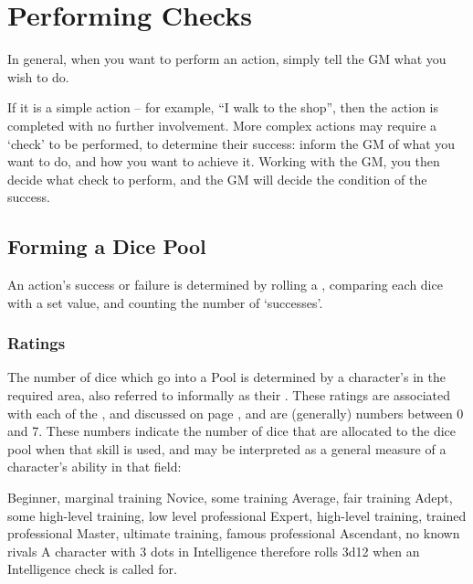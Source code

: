 \chapter{Performing Checks}\label{C:Checks}


In general, when you want to perform an action, simply tell the GM what you wish to do. 

If it is a simple action – for example, “I walk to the shop”, then the action is completed with no further involvement. More complex actions may require a ‘check’ to be performed, to determine their success: inform the GM of what you want to do, and how you want to achieve it. Working with the GM, you then decide what check to perform, and the GM will decide the condition of the success.


\section{Forming a Dice Pool}

An action's success or failure is determined by rolling a , comparing each dice with a set value, and counting the number of `successes'.

\subsection{Ratings}

The number of dice which go into a Pool is determined by a character's  in the required area, also referred to informally as their . These ratings are associated with each of the ,  and  discussed on page \pageref{C:Aspects}, and are (generally) numbers between 0 and 7. These numbers indicate the number of dice that are allocated to the dice pool when that skill is used, and may be interpreted as a general measure of a character's ability in that field:

{Beginner, marginal training}
{Novice, some training}
{Average, fair training}
{Adept, some high-level training, low level professional}
{Expert, high-level training, trained professional}
{Master, ultimate training, famous professional}
{Ascendant, no known rivals}
\normalsize
A character with 3 dots in Intelligence therefore rolls 3d12 when an Intelligence check is called for. 

